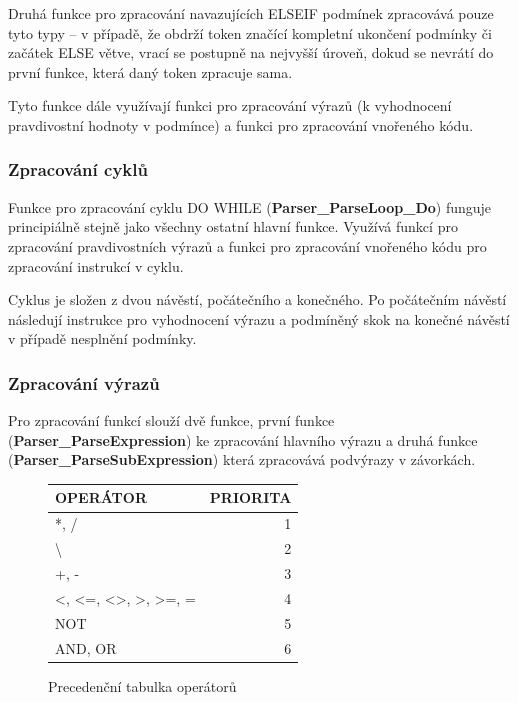 \documentclass[a4paper,11pt]{article}
\begin{document}
\vspace{2mm}
Druhá funkce pro zpracování navazujících \textsf{ELSEIF} podmínek zpracovává pouze tyto typy – v případě, že obdrží token značící kompletní ukončení podmínky či začátek \textsf{ELSE} větve, vrací se postupně na nejvyšší úroveň, dokud se nevrátí do první funkce, která daný token zpracuje sama.

\vspace{2mm}
Tyto funkce dále využívají funkci pro zpracování výrazů (k vyhodnocení pravdivostní hodnoty v podmínce) a funkci pro zpracování vnořeného kódu.

\subsubsection{Zpracování cyklů} \label{syse-reseni-cykly}
Funkce pro zpracování cyklu \textsf{DO WHILE} (\textbf{Parser\_ParseLoop\_Do}) funguje principiálně stejně jako všechny ostatní hlavní funkce. Využívá funkcí pro zpracování pravdivostních výrazů a funkci pro zpracování vnořeného kódu pro zpracování instrukcí v cyklu.

\vspace{2mm}
Cyklus je složen z dvou návěstí, počátečního a konečného. Po počátečním návěstí následují instrukce pro vyhodnocení výrazu a podmíněný skok na konečné návěstí v případě nesplnění podmínky.

\subsubsection{Zpracování výrazů} \label{syse-reseni-vyrazy}
Pro zpracování funkcí slouží dvě funkce, první funkce (\textbf{Parser\_ParseExpression}) ke zpracování hlavního výrazu a druhá funkce (\textbf{Parser\_ParseSubExpression}) která zpracovává podvýrazy v závorkách.

\begin{figure}
	\centering
	\renewcommand{\arraystretch}{1.3}
	\begin{tabular}{ l r }
		OPERÁTOR					& PRIORITA 	\\ \hline\hline
		*, /						& 1			\\ \hline
		\textbackslash				& 2			\\ \hline
		+, -						& 3			\\ \hline
		<, <=, <>, >, >=, =			& 4			\\ \hline
		\textsc{NOT}				& 5			\\ \hline
		\textsc{AND}, \textsc{OR}	& 6			\\ \hline
	\end{tabular}
	
	\caption{Precedenční tabulka operátorů}
	\label{fig:precedence_table}
\end{figure}
\end{document}
